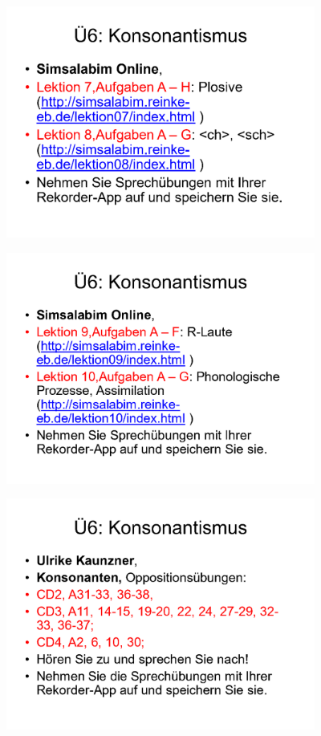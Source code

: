 \documentclass[
  letterpaper,
]{scrbook}
\begin{document}
\includegraphics[width=4in,height=\textheight]{./pictures/sprachlabor/Phonetikuebungen_S01_Page22.png}

\includegraphics[width=4in,height=\textheight]{./pictures/sprachlabor/Phonetikuebungen_S01_Page23.png}

\includegraphics[width=4in,height=\textheight]{./pictures/sprachlabor/Phonetikuebungen_S01_Page24.png}
\end{document}
